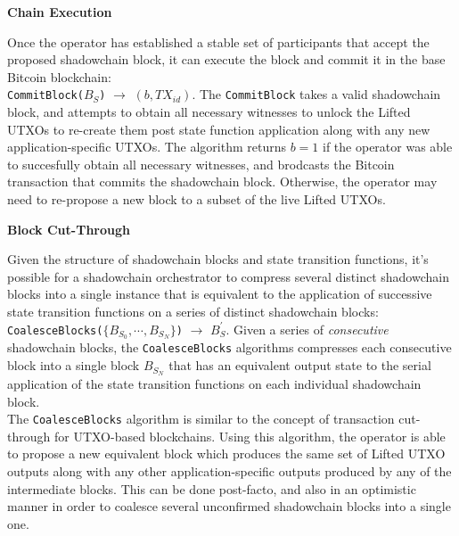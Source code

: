 \documentclass[10pt,a4paper]{article}
\theoremstyle{definition}
\begin{document}

\begin{center}
    \textbf{Chain Execution}
\end{center}

Once the operator has established a stable set of participants that accept the
proposed shadowchain block, it can execute the block and commit it in the base
Bitcoin blockchain: \\

\texttt{CommitBlock($B_S$)} $\rightarrow$ $(b, TX_{id})$. The
\texttt{CommitBlock} takes a valid shadowchain block, and attempts to obtain
all necessary witnesses to unlock the Lifted UTXOs to re-create them post state
function application along with any new application-specific UTXOs. The
algorithm returns $b=1$ if the operator was able to succesfully obtain all
necessary witnesses, and brodcasts the Bitcoin transaction that commits the
shadowchain block. Otherwise, the operator may need to re-propose a new block
to a subset of the live Lifted UTXOs.

\begin{center}
    \textbf{Block Cut-Through}
\end{center}

Given the structure of shadowchain blocks and state transition functions, it's
possible for a shadowchain orchestrator to compress several distinct
shadowchain blocks into a single instance that is equivalent to the application
of successive state transition functions on a series of distinct shadowchain
blocks: \\

\texttt{CoalesceBlocks($\{B_{S_0}, \cdots, B_{S_N}\}$)} $\rightarrow$
$B_{S}^\prime$. Given a series of \emph{consecutive} shadowchain blocks, the
\texttt{CoalesceBlocks} algorithms compresses each consecutive block into a
single block $B_{S_N}$ that has an equivalent output state to the serial
application of the state transition functions on each individual shadowchain
block. \\

The \texttt{CoalesceBlocks} algorithm is similar to the concept of transaction
cut-through \cite{cutThru} for UTXO-based blockchains. Using this algorithm, the
operator is able to propose a new equivalent block which produces the same set
of Lifted UTXO outputs along with any other application-specific outputs
produced by any of the intermediate blocks. This can be done post-facto, and
also in an optimistic manner in order to coalesce several unconfirmed
shadowchain blocks into a single one.
\end{document}

